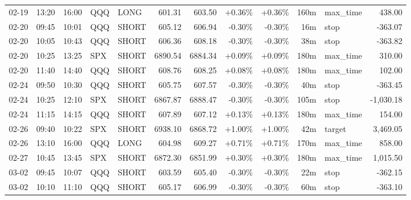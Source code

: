 \documentclass[11pt,a4paper,twoside]{article}
\begin{document}
\begin{center}
\begin{longtable}{>{\color{txtmain}}l l l l l r r r r r >{\color{txtmain}}l r}
02-19 & 13:20 & 16:00 & QQQ & LONG & 601.31 & 603.50 & \textcolor{wingreen}{+0.36\%} & \textcolor{wingreen}{+0.36\%} & 160m & max\_time & \textcolor{wingreen}{438.00} \\
02-20 & 09:45 & 10:01 & QQQ & SHORT & 605.12 & 606.94 & \textcolor{lossred}{-0.30\%} & \textcolor{lossred}{-0.30\%} & 16m & stop & \textcolor{lossred}{-363.07} \\
02-20 & 10:05 & 10:43 & QQQ & SHORT & 606.36 & 608.18 & \textcolor{lossred}{-0.30\%} & \textcolor{lossred}{-0.30\%} & 38m & stop & \textcolor{lossred}{-363.82} \\
02-20 & 10:25 & 13:25 & SPX & SHORT & 6890.54 & 6884.34 & \textcolor{wingreen}{+0.09\%} & \textcolor{wingreen}{+0.09\%} & 180m & max\_time & \textcolor{wingreen}{310.00} \\
02-20 & 11:40 & 14:40 & QQQ & SHORT & 608.76 & 608.25 & \textcolor{wingreen}{+0.08\%} & \textcolor{wingreen}{+0.08\%} & 180m & max\_time & \textcolor{wingreen}{102.00} \\
02-24 & 09:50 & 10:30 & QQQ & SHORT & 605.75 & 607.57 & \textcolor{lossred}{-0.30\%} & \textcolor{lossred}{-0.30\%} & 40m & stop & \textcolor{lossred}{-363.45} \\
02-24 & 10:25 & 12:10 & SPX & SHORT & 6867.87 & 6888.47 & \textcolor{lossred}{-0.30\%} & \textcolor{lossred}{-0.30\%} & 105m & stop & \textcolor{lossred}{-1,030.18} \\
02-24 & 11:15 & 14:15 & QQQ & SHORT & 607.89 & 607.12 & \textcolor{wingreen}{+0.13\%} & \textcolor{wingreen}{+0.13\%} & 180m & max\_time & \textcolor{wingreen}{154.00} \\
02-26 & 09:40 & 10:22 & SPX & SHORT & 6938.10 & 6868.72 & \textcolor{wingreen}{+1.00\%} & \textcolor{wingreen}{+1.00\%} & 42m & target & \textcolor{wingreen}{3,469.05} \\
02-26 & 13:10 & 16:00 & QQQ & LONG & 604.98 & 609.27 & \textcolor{wingreen}{+0.71\%} & \textcolor{wingreen}{+0.71\%} & 170m & max\_time & \textcolor{wingreen}{858.00} \\
02-27 & 10:45 & 13:45 & SPX & SHORT & 6872.30 & 6851.99 & \textcolor{wingreen}{+0.30\%} & \textcolor{wingreen}{+0.30\%} & 180m & max\_time & \textcolor{wingreen}{1,015.50} \\
03-02 & 09:45 & 10:07 & QQQ & SHORT & 603.59 & 605.40 & \textcolor{lossred}{-0.30\%} & \textcolor{lossred}{-0.30\%} & 22m & stop & \textcolor{lossred}{-362.15} \\
03-02 & 10:10 & 11:10 & QQQ & SHORT & 605.17 & 606.99 & \textcolor{lossred}{-0.30\%} & \textcolor{lossred}{-0.30\%} & 60m & stop & \textcolor{lossred}{-363.10} \\

\end{longtable}
\end{center}
\end{document}
